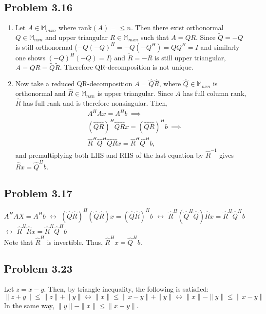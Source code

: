 \documentclass[letterpaper,12pt]{article}
\theoremstyle{definition}
\begin{document}
\begin{spacing}{1.3}{}
\subsection*{Problem 3.16}
\begin{enumerate}
  \item
  	Let $A\in\mathbb M_{mxn}$ where $\text{rank}(A)=\leq n$.
	Then there exist orthonormal $Q\in\mathbb M_{nxn}$ and
	upper triangular $R\in\mathbb M_{mxn}$ such that $A=QR$.
	Since $\tilde{Q}=-Q$ is still orthonormal ($-Q(-Q)^H=-Q(-Q^H)=QQ^H=I$
	and similarly one shows $(-Q)^H(-Q)=I$)
	and $\tilde{R}=-R$ is still upper triangular,
	$A=QR=\tilde{Q}\tilde{R}$.
	Therefore QR-decomposition is not unique. \\
	\item
	Now take a reduced QR-decomposition $A=\hat{Q}\hat{R}$,
	where $\hat{Q}\in\mathbb M_{nxn}$ is orthonormal and $\hat{R}\in\mathbb M_{nxn}$ is upper triangular.
	Since $A$ has full column rank, $\hat{R}$ has full rank and is therefore nonsingular.
	Then,
	\begin{align*}
	&A^HAx=A^Hb\ \implies\\
	&(\hat{Q}\hat{R})^H\hat{Q}\hat{R}x = (\hat{Q}\hat{R})^Hb\ \implies\\
	&\hat{R}^H\hat{Q}^H\hat{Q}\hat{R}x = \hat{R}^H\hat{Q}^Hb,
	\end{align*}
	and premultiplying both LHS and RHS of the last equation by $\hat{R}^{-1}$ gives
	$\hat{R}x = \hat{Q}^Hb$. \
\end{enumerate}

\subsection*{Problem 3.17}

$A^{H}AX = A^{H}b$ $\leftrightarrow$ $(\hat{Q} \hat{R})^{H} (\hat{Q} \hat{R}) x = (\hat{Q} \hat{R})^{H} b $ $\leftrightarrow$ $\hat{R}^{H} (\hat{Q}^{H} \hat{Q}) \hat{R} x = \hat{R}^{H} \hat{Q}^{H} b$ $\leftrightarrow$ $\hat{R}^{H} \hat{R} x = \hat{R}^{H} \hat{Q}^{H}b $ \\
	Note that $\hat{R}^{H}$ is invertible. Thus, $\hat{R}^{H} x = \hat{Q}^{H} b$.


\subsection*{Problem 3.23}

 Let $z = x-y$. Then, by triangle inequality, the following is satisfied: \\
	\[\|z+y\| \leq \|z\| + \|y\| \leftrightarrow \|x\| \leq \|x-y\| + \|y\| \leftrightarrow \|x\| - \|y\| \leq \|x-y\| \]
	In the same way, $\|y\| - \|x\| \leq \|x-y\|$.



\end{spacing}
\end{document}
